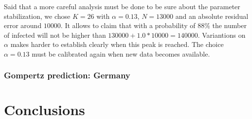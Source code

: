 \documentclass[6pt]{article}
\begin{document}
Said that a more careful analysis must be done to be sure about the
parameter stabilization, we chose $K = 26$ with $\alpha = 0.13$, $N=13000$
and an absolute residual error around $10000$. It allows to claim that
with a probability of $88\%$ the number of infected will not
be higher than $130000 + 1.0 * 10000 = 140000$.
Variantions on $\alpha$ makes harder to establish clearly when this peak
is reached. The choice $\alpha = 0.13$ must be calibrated again 
when new data becomes available.

\subsubsection {Gompertz prediction: Germany}


\section {Conclusions}
\end{document}
